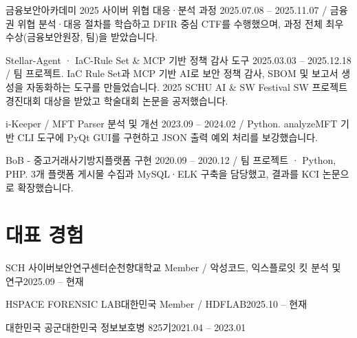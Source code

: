     \resumeProject
      {금융보안아카데미 2025 사이버 위협 대응·분석 과정}
      {2025.07.08 -- 2025.11.07 / 금융권 위협 분석·대응 절차를 학습하고 DFIR 중심 CTF를 수행했으며, 과정 전체 최우수상(금융보안원장, 팀)을 받았습니다.}
      \resumeItemListStart
      \resumeItemListEnd

    \resumeProject
      {Stellar-Agent · IaC-Rule Set \& MCP 기반 정책 감사 도구}
      {2025.03.03 -- 2025.12.18 / 팀 프로젝트. IaC Rule Set과 MCP 기반 AI로 보안 정책 감사, SBOM 및 보고서 생성을 자동화하는 도구를 만들었습니다. 2025 SCHU AI \& SW Festival SW 프로젝트 경진대회 대상을 받았고 학술대회 논문을 공저했습니다.}
      \resumeItemListStart
      \resumeItemListEnd

    \resumeProject
      {i-Keeper / MFT Parser 분석 및 개선}
      {2023.09 -- 2024.02 / Python. analyzeMFT 기반 CLI 도구에 PyQt GUI를 구현하고 JSON 출력 예외 처리를 보강했습니다.}

    \resumeProject
      {BoB - 중고거래사기방지플랫폼 구현}
      {2020.09 -- 2020.12 / 팀 프로젝트 · Python, PHP. 3개 플랫폼 게시물 수집과 MySQL·ELK 구축을 담당했고, 결과를 KCI 논문으로 확장했습니다.}
  \resumeSubHeadingListEnd

\section{대표 경험}
  \resumeSubHeadingListStart
    \resumeSubheading
      {SCH 사이버보안연구센터}{순천향대학교}
      {Member / 악성코드, 익스플로잇 킷 분석 및 연구}{2025.09 -- 현재}
      \resumeItemListStart
      \resumeItemListEnd

    \resumeSubheading
      {HSPACE FORENSIC LAB}{대한민국}
      {Member / HDFLAB}{2025.10 -- 현재}
      \resumeItemListStart
      \resumeItemListEnd

    \resumeSubheading
      {대한민국 공군}{대한민국}
      {정보보호병 825기}{2021.04 -- 2023.01}
      \resumeItemListStart
      \resumeItemListEnd

